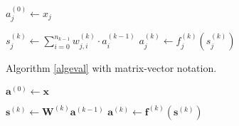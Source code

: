 \documentclass[titlepage]{article}
\begin{document}
      \begin{algorithm}
        \caption{%
          Evaluate the given input and produce the result in the output layer.
        } \label{algeval}
        \begin{algorithmic}
              \State $a_j^{(0)} \gets x_j$
            \EndFor

                \State $
                  s_j^{(k)} \gets
                    \sum_{i=0}^{n_{k-1}} w_{j,i}^{(k)} \cdot a_i^{(k-1)}
                $
                \State $a_j^{(k)} \gets f_j^{(k)} \left( s_j^{(k)} \right)$
              \EndFor
            \EndFor
          \EndProcedure
        \end{algorithmic}
      \end{algorithm}

      \begin{algorithm}
        \caption{Algorithm \ref{algeval} with matrix-vector notation.}
        \begin{algorithmic}
            \State $\mathbf{a}^{(0)} \gets \mathbf{x}$

              \State $
                \mathbf{s}^{(k)} \gets \mathbf{W}^{(k)} \mathbf{a}^{(k-1)}
              $
              \State $
                \mathbf{a}^{(k)} \gets
                  \mathbf{f}^{(k)} \left( \mathbf{s}^{(k)} \right)
              $
            \EndFor
          \EndProcedure
        \end{algorithmic}
      \end{algorithm}
\end{document}
